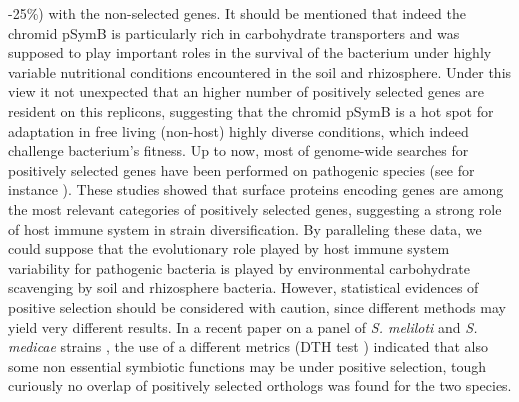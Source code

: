 -25\%) with the non-selected genes. It should be mentioned that indeed the chromid pSymB is particularly rich in carbohydrate transporters \cite{finan2001complete} and was supposed to play important roles in the survival of the bacterium under highly variable nutritional conditions encountered in the soil and rhizosphere. Under this view it not unexpected that an higher number of positively selected genes are resident on this replicons, suggesting that the chromid pSymB is a hot spot for adaptation in free living (non-host) highly diverse conditions, which indeed challenge bacterium’s fitness. Up to now, most of genome-wide searches for positively selected genes have been performed on pathogenic species (see for instance \cite{petersen2007genes}). These studies showed that surface proteins encoding genes are among the most relevant categories of positively selected genes, suggesting a strong role of host immune system in strain diversification. By paralleling these data, we could suppose that the evolutionary role played by host immune system variability for pathogenic bacteria is played by environmental carbohydrate scavenging by soil and rhizosphere bacteria. However, statistical evidences of positive selection should be considered with caution, since different methods may yield very different results. In a recent paper on a panel of \textit{S. meliloti} and \textit{S. medicae} strains \cite{epstein2012population}, the use of a different metrics (DTH test \cite{zeng2006statistical}) indicated that also some non essential symbiotic functions may be under positive selection, tough curiously no overlap of positively selected orthologs was found for the two species.

